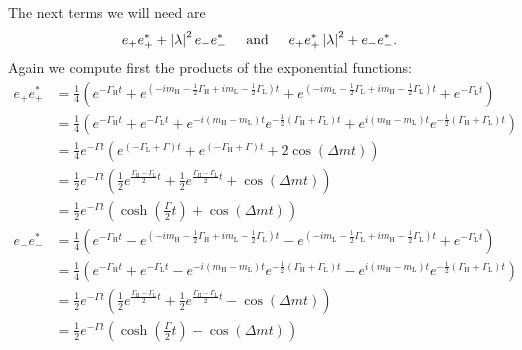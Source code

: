The next terms we will need are
\begin{equation}
  e_{+}e_{+}^*+\left|\lambda\right|^2e_-e_-^* \hspace{0.5cm} \text{and} \hspace{0.5cm} e_{+}e_{+}^*\left|\lambda\right|^2+e_-e_-^*.
\end{equation}
Again we compute first the products of the exponential functions:
\begin{align}
  e_+e_+^* &= \frac{1}{4}\left(e^{-\Gamma_{\text{H}}t}+e^{\left(-im_{\text{H}}-\frac{1}{2}\Gamma_{\text{H}}+im_{\text{L}}-\frac{1}{2}\Gamma_{\text{L}}\right)t}
  +e^{\left(-im_{\text{L}}-\frac{1}{2}\Gamma_{\text{L}}+im_{\text{H}}-\frac{1}{2}\Gamma_{\text{L}}\right)t}+e^{-\Gamma_{\text{L}}t}\right)\nonumber\\
  &= \frac{1}{4}\left(e^{-\Gamma_{\text{H}}t}+e^{-\Gamma_{\text{L}}t}+e^{-i\left(m_{\text{H}}-m_{\text{L}}\right)t}e^{-\frac{1}{2}\left(\Gamma_{\text{H}}+\Gamma_{\text{L}}\right)t}
  +e^{i\left(m_{\text{H}}-m_{\text{L}}\right)t}e^{-\frac{1}{2}\left(\Gamma_{\text{H}}+\Gamma_{\text{L}}\right)t}\right)\nonumber\\
  &=\frac{1}{4}e^{-\Gamma t}\left(e^{\left(-\Gamma_{\text{L}}+\Gamma\right)t}+e^{\left(-\Gamma_{\text{H}}+\Gamma\right)t}+2\cos\left(\Delta mt\right)\right)\nonumber\\
  &=\frac{1}{2}e^{-\Gamma t}\left(\frac{1}{2}e^{\frac{\Gamma_{\text{H}}-\Gamma_{\text{L}}}{2}t}+\frac{1}{2}e^{\frac{\Gamma_{\text{H}}-\Gamma_{\text{L}}}{2}t}+\cos\left(\Delta mt\right)\right)\nonumber\\
  &=\frac{1}{2}e^{-\Gamma t}\left(\cosh\left(\frac{\Gamma}{2}t\right)+\cos\left(\Delta mt\right)\right)\label{eq:third_calculation}\\
  e_-e_-^* &= \frac{1}{4}\left(e^{-\Gamma_{\text{H}}t}-e^{\left(-im_{\text{H}}-\frac{1}{2}\Gamma_{\text{H}}+im_{\text{L}}-\frac{1}{2}\Gamma_{\text{L}}\right)t}
  -e^{\left(-im_{\text{L}}-\frac{1}{2}\Gamma_{\text{L}}+im_{\text{H}}-\frac{1}{2}\Gamma_{\text{L}}\right)t}+e^{-\Gamma_{\text{L}}t}\right)\nonumber\\
  &= \frac{1}{4}\left(e^{-\Gamma_{\text{H}}t}+e^{-\Gamma_{\text{L}}t}-e^{-i\left(m_{\text{H}}-m_{\text{L}}\right)t}e^{-\frac{1}{2}\left(\Gamma_{\text{H}}+\Gamma_{\text{L}}\right)t}
  -e^{i\left(m_{\text{H}}-m_{\text{L}}\right)t}e^{-\frac{1}{2}\left(\Gamma_{\text{H}}+\Gamma_{\text{L}}\right)t}\right)\nonumber\\
  &= \frac{1}{2}e^{-\Gamma t}\left(\frac{1}{2}e^{\frac{\Gamma_{\text{H}}-\Gamma_{\text{L}}}{2}t}+\frac{1}{2}e^{\frac{\Gamma_{\text{H}}-\Gamma_{\text{L}}}{2}t}-\cos\left(\Delta mt\right)\right)\nonumber\\
  &= \frac{1}{2}e^{-\Gamma t}\left(\cosh\left(\frac{\Gamma}{2}t\right)-\cos\left(\Delta mt\right)\right)\label{eq:fourth_calculation}
\end{align}
